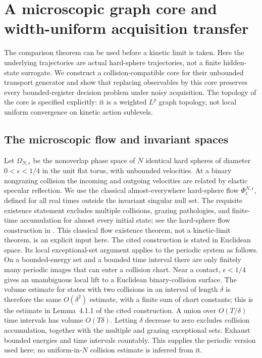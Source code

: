 \section{A microscopic graph core and width-uniform acquisition transfer}
\label{sec:v11-hard-sphere}

The comparison theorem can be used before a kinetic limit is taken.
Here the underlying trajectories are actual hard-sphere trajectories,
not a finite hidden-state surrogate. We construct a collision-compatible
core for their unbounded transport generator and show that replacing
observables by this core preserves every bounded-register decision problem
under noisy acquisition. The topology of the core is specified explicitly:
it is a weighted $L^p$ graph topology, not local uniform convergence on
kinetic action sublevels.

\subsection{The microscopic flow and invariant spaces}
Let $\Omega_{N,\epsilon}$ be the nonoverlap phase space of $N$ identical
hard spheres of diameter $0<\epsilon<1/4$ in the unit flat torus, with unbounded
velocities. At a binary nongrazing collision the incoming and outgoing
velocities are related by elastic specular reflection. We use the
classical almost-everywhere hard-sphere flow $\Phi_t^{N,\epsilon}$,
defined for all real times outside the invariant singular null set.
The requisite existence statement excludes multiple collisions, grazing
pathologies, and finite-time accumulation for almost every initial state;
see the hard-sphere flow construction in \cite{GallagherSaintRaymondTexier}.
This classical flow existence theorem, not a kinetic-limit theorem, is
an explicit input here. The cited construction is stated in Euclidean
space. Its local exceptional-set argument applies to the periodic system
as follows. On a bounded-energy set and a bounded time interval there are
only finitely many periodic images that can enter a collision chart.
Near a contact, $\epsilon<1/4$ gives an unambiguous local lift to a
Euclidean binary-collision surface. The volume estimate for states with
two collisions in an interval of length $\delta$ is therefore the same
$O(\delta^2)$ estimate, with a finite sum of chart constants; this is the
estimate in Lemma~4.1.1 of the cited construction. A union over
$O(T/\delta)$ time intervals has volume $O(T\delta)$. Letting
$\delta$ decrease to zero excludes collision accumulation, together
with the multiple and grazing exceptional sets. Exhaust bounded energies
and time intervals countably. This supplies the periodic version used
here; no uniform-in-$N$ collision estimate is inferred from it.

